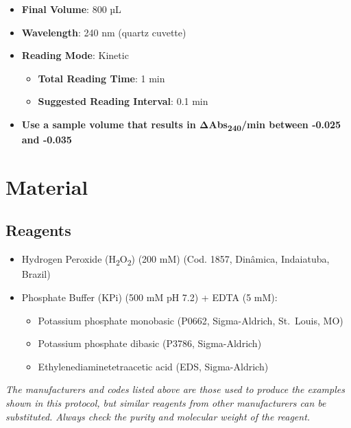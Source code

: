 \documentclass[
  9pt,
  american,
  a5paper,
  extrafontsizes,onecolumn,openright
  ]{memoir}
\providecommand{\tightlist}{%
  \setlength{\itemsep}{0pt}\setlength{\parskip}{0pt}}
\begin{document}
\begin{itemize}
\tightlist
\item
  \textbf{Final Volume}: 800 µL
\item
  \textbf{Wavelength}: 240 nm (quartz cuvette)
\item
  \textbf{Reading Mode}: Kinetic

  \begin{itemize}
  \tightlist
  \item
    \textbf{Total Reading Time}: 1 min
  \item
    \textbf{Suggested Reading Interval}: 0.1 min
  \end{itemize}
\item
  \textbf{Use a sample volume that results in ΔAbs\textsubscript{240}/min between -0.025 and -0.035}
\end{itemize}

\newpage

\section{Material}\label{cat_detailed_protocol}

\subsection{Reagents}\label{reagents}

\begin{itemize}
\tightlist
\item
  Hydrogen Peroxide (H\textsubscript{2}O\textsubscript{2}) (200 mM) (Cod. 1857, Dinâmica, Indaiatuba, Brazil)
\item
  Phosphate Buffer (KPi) (500 mM pH 7.2) + EDTA (5 mM):

  \begin{itemize}
  \tightlist
  \item
    Potassium phosphate monobasic (P0662, Sigma-Aldrich, St.~Louis, MO)
  \item
    Potassium phosphate dibasic (P3786, Sigma-Aldrich)
  \item
    Ethylenediaminetetraacetic acid (EDS, Sigma-Aldrich)
  \end{itemize}
\end{itemize}

\begin{greybox}[frametitle = Note]
\emph{The manufacturers and codes listed above are those used to produce the examples shown in this protocol, but similar reagents from other manufacturers can be substituted. Always check the purity and molecular weight of the reagent.}

\end{greybox}
\end{document}
